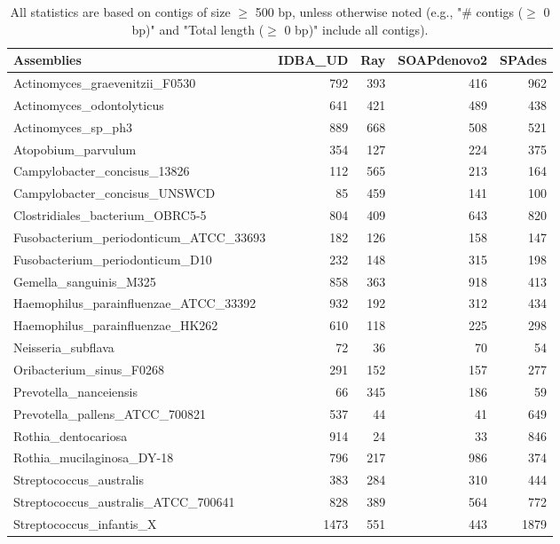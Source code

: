 \documentclass[12pt,a4paper]{article}
\begin{document}
\begin{table}[ht]
\begin{center}
\caption{All statistics are based on contigs of size $\geq$ 500 bp, unless otherwise noted (e.g., "\# contigs ($\geq$ 0 bp)" and "Total length ($\geq$ 0 bp)" include all contigs).}
\begin{tabular}{|l*{4}{|r}|}
\hline
Assemblies & IDBA\_UD & Ray & SOAPdenovo2 & SPAdes \\ \hline
Actinomyces\_graevenitzii\_F0530 & 792 & 393 & 416 & 962 \\ \hline
Actinomyces\_odontolyticus & 641 & 421 & 489 & 438 \\ \hline
Actinomyces\_sp\_ph3 & 889 & 668 & 508 & 521 \\ \hline
Atopobium\_parvulum & 354 & 127 & 224 & 375 \\ \hline
Campylobacter\_concisus\_13826 & 112 & 565 & 213 & 164 \\ \hline
Campylobacter\_concisus\_UNSWCD & 85 & 459 & 141 & 100 \\ \hline
Clostridiales\_bacterium\_OBRC5-5 & 804 & 409 & 643 & 820 \\ \hline
Fusobacterium\_periodonticum\_ATCC\_33693 & 182 & 126 & 158 & 147 \\ \hline
Fusobacterium\_periodonticum\_D10 & 232 & 148 & 315 & 198 \\ \hline
Gemella\_sanguinis\_M325 & 858 & 363 & 918 & 413 \\ \hline
Haemophilus\_parainfluenzae\_ATCC\_33392 & 932 & 192 & 312 & 434 \\ \hline
Haemophilus\_parainfluenzae\_HK262 & 610 & 118 & 225 & 298 \\ \hline
Neisseria\_subflava & 72 & 36 & 70 & 54 \\ \hline
Oribacterium\_sinus\_F0268 & 291 & 152 & 157 & 277 \\ \hline
Prevotella\_nanceiensis & 66 & 345 & 186 & 59 \\ \hline
Prevotella\_pallens\_ATCC\_700821 & 537 & 44 & 41 & 649 \\ \hline
Rothia\_dentocariosa & 914 & 24 & 33 & 846 \\ \hline
Rothia\_mucilaginosa\_DY-18 & 796 & 217 & 986 & 374 \\ \hline
Streptococcus\_australis & 383 & 284 & 310 & 444 \\ \hline
Streptococcus\_australis\_ATCC\_700641 & 828 & 389 & 564 & 772 \\ \hline
Streptococcus\_infantis\_X & 1473 & 551 & 443 & 1879 \\ \hline

\end{tabular}
\end{center}
\end{table}
\end{document}
